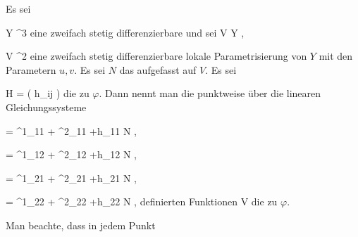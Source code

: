{}
{

Es sei

\mavergleichskette
{\vergleichskette
{ Y
}
{ \subseteq }{ \R^3
}
{  }{
}
{    }{
}
{   }{
}
}
{}{}{}
eine zweifach stetig differenzierbare
und sei
\maabbdisp {\varphi} { V } { Y
} {,}

\mavergleichskette
{\vergleichskette
{ V
}
{ \subseteq }{ \R^2
}
{  }{
}
{    }{
}
{   }{
}
}
{}{}{}
eine zweifach stetig differenzierbare lokale Parametrisierung von $Y$ mit den Parametern $u,v$. Es sei $N$ das
aufgefasst auf $V$. Es sei

\mavergleichskette
{\vergleichskette
{ H
}
{ = }{ \left(  h_{ij}  \right)
}
{  }{
}
{    }{
}
{   }{
}
}
{}{}{}
die
zu $\varphi$. Dann nennt man die punktweise über die linearen Gleichungssysteme

\mavergleichskettedisp
{\vergleichskette
{ {  }
}
{ =} { \Gamma^1_{11}  {  } + \Gamma^2_{11} {  } +h_{11} N
}
{ } {
}
{ } {
}
{ } {
}
}
{}{}{,}

\mavergleichskettedisp
{\vergleichskette
{ {  } {  }
}
{ =} { \Gamma^1_{12} {  } + \Gamma^2_{12}  {  } +h_{12} N
}
{ } {
}
{ } {
}
{ } {
}
}
{}{}{,}

\mavergleichskettedisp
{\vergleichskette
{ {  } {  }
}
{ =} { \Gamma^1_{21} {  } + \Gamma^2_{21}   {  } +h_{21} N
}
{ } {
}
{ } {
}
{ } {
}
}
{}{}{,}

\mavergleichskettedisp
{\vergleichskette
{ {  }
}
{ =} { \Gamma^1_{22} {  } + \Gamma^2_{22}   {  } +h_{22} N
}
{ } {
}
{ } {
}
{ } {
}
}
{}{}{,}
definierten Funktionen
 { V } {\R
} {}
die
zu $\varphi$.

}

Man beachte, dass
 in jedem Punkt

